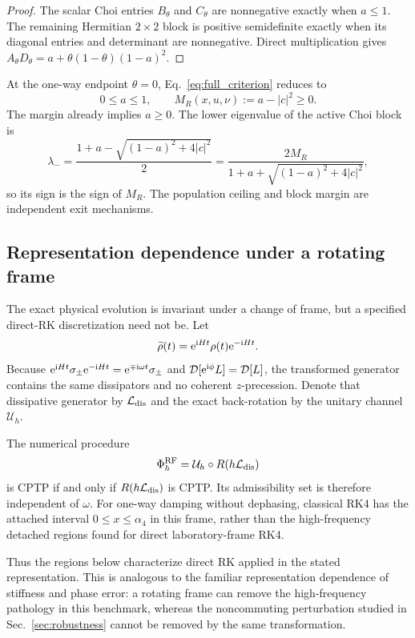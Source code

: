 \begin{proof}
The scalar Choi entries $B_\theta$ and $C_\theta$ are nonnegative exactly when $a\le1$. The remaining Hermitian $2\times2$ block is positive semidefinite exactly when its diagonal entries and determinant are nonnegative. Direct multiplication gives $A_\theta D_\theta=a+\theta(1-\theta)(1-a)^2$.
\end{proof}

At the one-way endpoint $\theta=0$, Eq.~\eqref{eq:full_criterion} reduces to
\begin{equation}
 0\le a\le1,
 \qquad
 M_R(x,u,\nu):=a-|c|^2\ge0.
 \label{eq:one_way_criterion}
\end{equation}
The margin already implies $a\ge0$. The lower eigenvalue of the active Choi block is
\begin{equation}
 \lambda_-=
 \frac{1+a-\sqrt{(1-a)^2+4|c|^2}}{2}
 =\frac{2M_R}{1+a+\sqrt{(1-a)^2+4|c|^2}},
 \label{eq:lambda_margin}
\end{equation}
so its sign is the sign of $M_R$. The population ceiling and block margin are independent exit mechanisms.

\subsection{Representation dependence under a rotating frame}
\label{subsec:rotating_frame}

The exact physical evolution is invariant under a change of frame, but a specified direct-RK discretization need not be. Let
\begin{equation}
 \widetilde\rho(t)=\mathrm{e}^{\mathrm{i} Ht}\rho(t)\mathrm{e}^{-\mathrm{i} Ht}.
\end{equation}
Because $\mathrm{e}^{\mathrm{i} Ht}\sigma_\pm\mathrm{e}^{-\mathrm{i} Ht}=\mathrm{e}^{\mp\mathrm{i}\omega t}\sigma_\pm$ and $\mathcal D[\mathrm{e}^{\mathrm{i}\phi}L]=\mathcal D[L]$, the transformed generator contains the same dissipators and no coherent $z$-precession. Denote that dissipative generator by $\mathcal L_{\rm dis}$ and the exact back-rotation by the unitary channel $\mathcal U_h$.

\begin{proposition}
\label{prop:rotating_frame}
The numerical procedure
\begin{equation}
 \Phi_h^{\rm RF}=\mathcal U_h\circ R(h\mathcal L_{\rm dis})
 \label{eq:rotating_frame_step}
\end{equation}
is CPTP if and only if $R(h\mathcal L_{\rm dis})$ is CPTP. Its admissibility set is therefore independent of $\omega$. For one-way damping without dephasing, classical RK4 has the attached interval $0\le x\le\alpha_4$ in this frame, rather than the high-frequency detached regions found for direct laboratory-frame RK4.
\end{proposition}

Thus the regions below characterize direct RK applied in the stated representation. This is analogous to the familiar representation dependence of stiffness and phase error: a rotating frame can remove the high-frequency pathology in this benchmark, whereas the noncommuting perturbation studied in Sec.~\ref{sec:robustness} cannot be removed by the same transformation.
